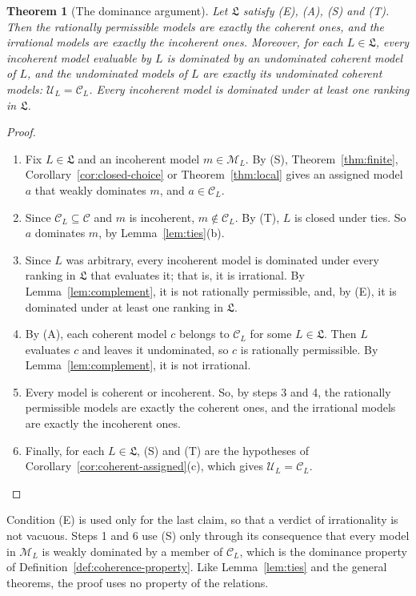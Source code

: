 \documentclass[11pt]{article}
\newtheorem{theorem}{Theorem}[section]
\theoremstyle{definition}
\theoremstyle{remark}
\newcommand{\M}{\mathcal M}
\newcommand{\C}{\mathcal C}
\newcommand{\U}{\mathcal U}
\newcommand{\Lf}{\mathfrak L}
\begin{document}
\begin{theorem}[The dominance argument]\label{thm:argument}
Let $\Lf$ satisfy (E), (A), (S) and (T). Then the rationally permissible models are exactly the coherent ones, and the irrational models are exactly the incoherent ones. Moreover, for each $L\in\Lf$, every incoherent model evaluable by $L$ is dominated by an undominated coherent model of $L$, and the undominated models of $L$ are exactly its undominated coherent models: $\U_L=\C_L$. Every incoherent model is dominated under at least one ranking in $\Lf$.
\end{theorem}
\begin{proof}
\leavevmode
\begin{enumerate}[label=\arabic*.,leftmargin=*]
\item Fix $L\in\Lf$ and an incoherent model $m\in\M_L$. By (S), Theorem~\ref{thm:finite}, Corollary~\ref{cor:closed-choice} or Theorem~\ref{thm:local} gives an assigned model $a$ that weakly dominates $m$, and $a\in\C_L$.
\item Since $\C_L\subseteq\C$ and $m$ is incoherent, $m\notin\C_L$. By (T), $L$ is closed under ties. So $a$ dominates $m$, by Lemma~\ref{lem:ties}(b).
\item Since $L$ was arbitrary, every incoherent model is dominated under every ranking in $\Lf$ that evaluates it; that is, it is irrational. By Lemma~\ref{lem:complement}, it is not rationally permissible, and, by (E), it is dominated under at least one ranking in $\Lf$.
\item By (A), each coherent model $c$ belongs to $\C_L$ for some $L\in\Lf$. Then $L$ evaluates $c$ and leaves it undominated, so $c$ is rationally permissible. By Lemma~\ref{lem:complement}, it is not irrational.
\item Every model is coherent or incoherent. So, by steps 3 and 4, the rationally permissible models are exactly the coherent ones, and the irrational models are exactly the incoherent ones.
\item Finally, for each $L\in\Lf$, (S) and (T) are the hypotheses of Corollary~\ref{cor:coherent-assigned}(c), which gives $\U_L=\C_L$.\qedhere
\end{enumerate}
\end{proof}

Condition (E) is used only for the last claim, so that a verdict of irrationality is not vacuous. Steps 1 and 6 use (S) only through its consequence that every model in $\M_L$ is weakly dominated by a member of $\C_L$, which is the dominance property of Definition~\ref{def:coherence-property}. Like Lemma~\ref{lem:ties} and the general theorems, the proof uses no property of the relations.
\end{document}

